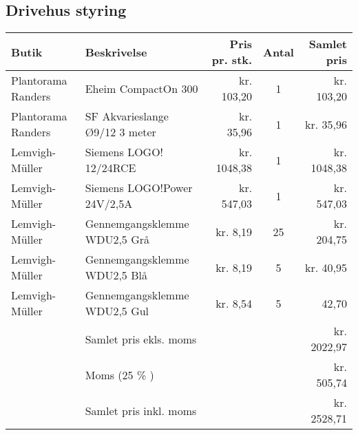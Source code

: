 \subsection{Drivehus styring}
\begin{tabular}[c]{|l|l|r|c|r|}
    \hline
    Butik & Beskrivelse & Pris pr. stk. & Antal & Samlet pris \\
    \hline \hline
    Plantorama Randers & Eheim CompactOn 300 &  kr. 103,20 & 1 & kr. 103,20 \\
    \hline
    Plantorama Randers & SF Akvarieslange Ø9/12 3 meter & kr. 35,96 & 1 & kr. 35,96 \\
    \hline
    Lemvigh-Müller & Siemens LOGO! 12/24RCE & kr. 1048,38 & 1 & kr. 1048,38 \\
    \hline
    Lemvigh-Müller & Siemens LOGO!Power 24V/2,5A &  kr. 547,03 & 1 & kr. 547,03 \\
    \hline
    Lemvigh-Müller & Gennemgangsklemme WDU2,5 Grå & kr. 8,19 & 25 & kr. 204,75 \\
    \hline
    Lemvigh-Müller & Gennemgangsklemme WDU2,5 Blå & kr. 8,19 & 5 & kr. 40,95 \\
    \hline
    Lemvigh-Müller & Gennemgangsklemme WDU2,5 Gul & kr. 8,54 & 5 & 42,70 \\
    \hline
                    & Samlet pris ekls. moms &  & & kr. 2022,97 \\
                    & Moms (25 \% ) & & & kr. 505,74 \\
                    & Samlet pris inkl. moms & & & kr. 2528,71 \\
                    \hline

\end{tabular}